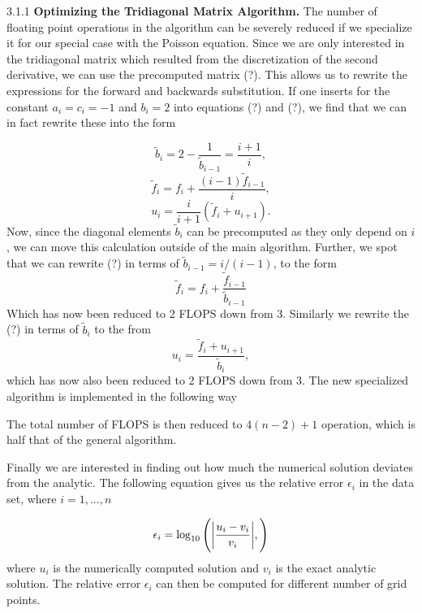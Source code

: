 \documentclass[a4paper,10pt]{article}
\begin{document}
\bigskip

3.1.1 \textbf{Optimizing the Tridiagonal Matrix Algorithm.}
The number of floating point operations in the algorithm can be severely reduced if we specialize it for our special case with the Poisson equation. Since we are only interested in the tridiagonal matrix which resulted from the discretization of the second derivative, we can use the precomputed matrix (?). This allows us to rewrite the expressions for the forward and backwards substitution. If one inserts for the constant $a_i =  c_i = -1$ and $b_i = 2$ into equations (?) and (?), we find that we can in fact rewrite these into the form

\begin{equation}
\tilde{b}_i = 2 - \frac{1}{\tilde{b}_{i-1}} = \frac{i+1}{i},
\end{equation}
\begin{equation}
\tilde{f}_i = f_i + \frac{(i-1)\tilde{f}_{i-1}}{i},
\end{equation}
\begin{equation}
u_{i} = \frac{i}{i+1}(\tilde{f}_{i} +u_{i+1}).
\end{equation}
Now, since the diagonal elements $\tilde{b}_i$ can be precomputed as they only depend on $i$, we can move this calculation outside of the main algorithm. Further, we spot that we can rewrite (?) in terms of $\tilde{b}_{i-1} = i/(i-1) $, to the form
\begin{equation}
\tilde{f}_i = f_i + \frac{\tilde{f}_{i-1}}{\tilde{b}_{i-1}}
\end{equation}
Which has now been reduced to 2 FLOPS down from 3. Similarly we rewrite the (?) in terms of $\tilde{b}_i$ to the from
\begin{equation}
u_i = \frac{\tilde{f}_i + u_{i+1}}{\tilde{b}_i},
\end{equation}
which has now also been reduced to 2 FLOPS down from 3. 
\newpage
The new specialized algorithm is implemented in the
 following way

The total number of FLOPS is then reduced to $4(n-2) + 1$ operation, which is half that of the general algorithm. 

Finally we are interested in finding out how much the numerical solution deviates from the analytic. The following equation gives us the relative error $\epsilon_i$ in the data set, where $i = 1, ...,n$

\begin{equation}
\epsilon_i = \log_{10} \left( \abs{\frac{u_i - v_i}{v_i}}, \right)
\end{equation}
where $u_i$ is the numerically computed solution and $v_i$ is the exact analytic solution. The relative error $\epsilon_i$ can then be computed for different number of grid points. 
\end{document}
